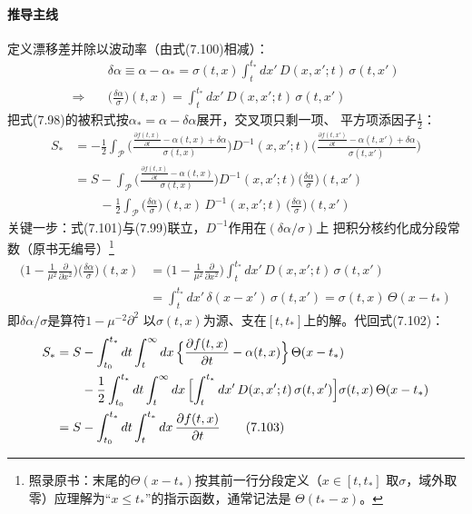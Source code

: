 \paragraph{推导主线}
定义漂移差并除以波动率（由式(7.100)相减）：
\begin{align*}
&\delta\alpha\equiv\alpha-\alpha_{*}=\sigma(t,x)\int_{t}^{t_{*}}dx'\,
D(x,x';t)\,\sigma(t,x')\\
\Rightarrow\quad&\biggl(\frac{\delta\alpha}{\sigma}\biggr)(t,x)
=\int_{t}^{t_{*}}dx'\,D(x,x';t)\,\sigma(t,x')
\tag{7.101}
\end{align*}
把式(7.98)的被积式按$\alpha_{*}=\alpha-\delta\alpha$展开，交叉项只剩一项、
平方项添因子$\tfrac{1}{2}$：
\begin{align*}
S_{*}&=-\frac{1}{2}\int_{\mathcal{P}}
\biggl(\frac{\frac{\partial f(t,x)}{\partial t}-\alpha(t,x)+\delta\alpha}{\sigma(t,x)}
\biggr)D^{-1}(x,x';t)
\biggl(\frac{\frac{\partial f(t,x')}{\partial t}-\alpha(t,x')+\delta\alpha}{\sigma(t,x')}
\biggr)\\
&=S-\int_{\mathcal{P}}\biggl(\frac{\frac{\partial f(t,x)}{\partial t}
-\alpha(t,x)}{\sigma(t,x)}\biggr)D^{-1}(x,x';t)
\biggl(\frac{\delta\alpha}{\sigma}\biggr)(t,x')\\
&\qquad-\frac{1}{2}\int_{\mathcal{P}}\biggl(\frac{\delta\alpha}{\sigma}\biggr)(t,x)
\,D^{-1}(x,x';t)\,\biggl(\frac{\delta\alpha}{\sigma}\biggr)(t,x')
\tag{7.102}
\end{align*}
关键一步：式(7.101)与(7.99)联立，$D^{-1}$作用在$(\delta\alpha/\sigma)$上
把积分核约化成分段常数（原书无编号）\footnote{照录原书：末尾的$\Theta(x-t_{*})$按其前一行分段定义（$x\in[t,t_{*}]$
取$\sigma$，域外取零）应理解为“$x\le t_{*}$”的指示函数，通常记法是
$\Theta(t_{*}-x)$。}
\begin{align*}
\biggl(1-\frac{1}{\mu^{2}}\frac{\partial}{\partial x^{2}}\biggr)
\biggl(\frac{\delta\alpha}{\sigma}\biggr)(t,x)
&=\biggl(1-\frac{1}{\mu^{2}}\frac{\partial}{\partial x^{2}}\biggr)
\int_{t}^{t_{*}}dx'\,D(x,x';t)\,\sigma(t,x')\\
&=\int_{t}^{t_{*}}dx'\,\delta(x-x')\,\sigma(t,x')
=\sigma(t,x)\,\Theta(x-t_{*})
\end{align*}即$\delta\alpha/\sigma$是算符$1-\mu^{-2}\partial^{2}$
以$\sigma(t,x)$为源、支在$[t,t_{*}]$上的解。代回式(7.102)：
\begin{align*}
S_{*}&=S-\int_{t_{0}}^{t_{*}}dt\int_{t}^{\infty}dx\,
\Bigl\{\frac{\partial f(t,x)}{\partial t}-\alpha(t,x)\Bigr\}\,\Theta(x-t_{*})\\
&\qquad-\frac{1}{2}\int_{t_{0}}^{t_{*}}dt\int_{t}^{\infty}dx\,
\Bigl[\int_{t}^{t_{*}}dx'\,D(x,x';t)\,\sigma(t,x')\Bigr]\sigma(t,x)\,
\Theta(x-t_{*})\\
&=S-\int_{t_{0}}^{t_{*}}dt\int_{t}^{t_{*}}dx\,\frac{\partial f(t,x)}{\partial t}
\tag{7.103}
\end{align*}
